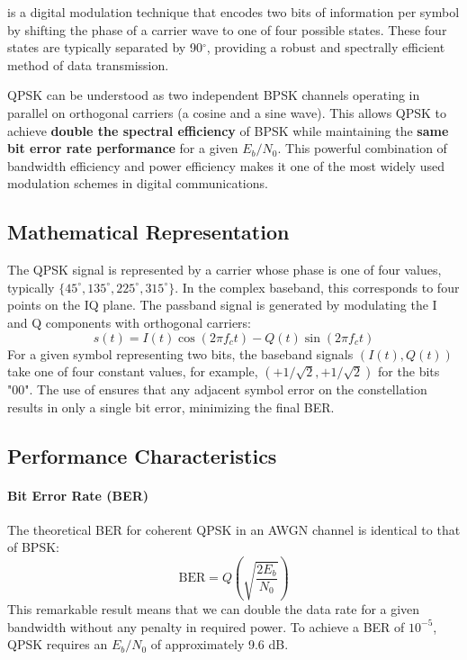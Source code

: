  is a digital modulation technique that encodes two bits of information per symbol by shifting the phase of a carrier wave to one of four possible states. These four states are typically separated by 90$^\circ$, providing a robust and spectrally efficient method of data transmission.

\begin{keyconcept}
    QPSK can be understood as two independent BPSK channels operating in parallel on orthogonal carriers (a cosine and a sine wave). This allows QPSK to achieve \textbf{double the spectral efficiency} of BPSK while maintaining the \textbf{same bit error rate performance} for a given $E_b/N_0$. This powerful combination of bandwidth efficiency and power efficiency makes it one of the most widely used modulation schemes in digital communications.
\end{keyconcept}


\subsection{Mathematical Representation}

The QPSK signal is represented by a carrier whose phase is one of four values, typically $\{45^\circ, 135^\circ, 225^\circ, 315^\circ\}$. In the complex baseband, this corresponds to four points on the IQ plane. The passband signal is generated by modulating the I and Q components with orthogonal carriers:
\begin{equation}
    s(t) = I(t) \cos(2\pi f_c t) - Q(t) \sin(2\pi f_c t)
\end{equation}
For a given symbol representing two bits, the baseband signals $(I(t), Q(t))$ take one of four constant values, for example, $(+1/\sqrt{2}, +1/\sqrt{2})$ for the bits "00". The use of  ensures that any adjacent symbol error on the constellation results in only a single bit error, minimizing the final BER.


\subsection{Performance Characteristics}

\paragraph{Bit Error Rate (BER)}
The theoretical BER for coherent QPSK in an AWGN channel is identical to that of BPSK:
\begin{equation}
    \text{BER} = Q\left(\sqrt{\frac{2E_b}{N_0}}\right)
\end{equation}
This remarkable result means that we can double the data rate for a given bandwidth without any penalty in required power. To achieve a BER of $10^{-5}$, QPSK requires an $E_b/N_0$ of approximately 9.6 dB.


